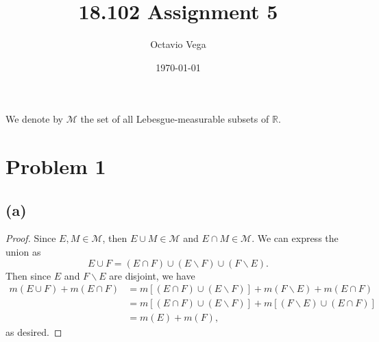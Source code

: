\documentclass{article}
\title{18.102 Assignment 5}
\author{Octavio Vega}
\date\today
\newcommand{\R}{\mathbb{R}} %
\newcommand{\M}{\mathcal{M}} %
\begin{document}
\maketitle

We denote by $\M$ the set of all Lebesgue-measurable subsets of $\R$.

\section*{Problem 1}
\subsection*{(a)}
\begin{proof}
	Since $E, M \in \M$, then $E \cup M \in \M$ and $E \cap M \in \M$. We can express the union as 
	\begin{equation}
		E \cup F = (E \cap F) \cup (E \backslash F) \cup (F \backslash E).
	\end{equation}
	Then since $E$ and $F \backslash E$ are disjoint, we have
	\begin{align}
		m(E \cup F) + m(E \cap F) &= m\left[(E \cap F) \cup (E \backslash F)\right] + m(F \backslash E) + m(E \cap F) \\
		&= m\left[(E \cap F) \cup (E \backslash F)\right] + m\left[(F \backslash E) \cup (E \cap F)\right] \\
		&= m(E) + m(F),
	\end{align}
	as desired.	
\end{proof}
\end{document}

